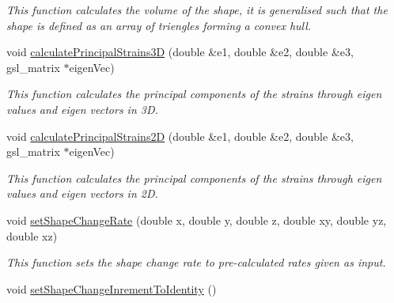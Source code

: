\begin{DoxyCompactItemize}
\begin{DoxyCompactList}\small\item\em This function calculates the volume of the shape, it is generalised such that the shape is defined as an array of triengles forming a convex hull. \end{DoxyCompactList}\item 
\hypertarget{classShapeBase_a3cde54fe712bac297fa73949d07c1bd4}{}void \hyperlink{classShapeBase_a3cde54fe712bac297fa73949d07c1bd4}{calculate\+Principal\+Strains3\+D} (double \&e1, double \&e2, double \&e3, gsl\+\_\+matrix $\ast$eigen\+Vec)\label{classShapeBase_a3cde54fe712bac297fa73949d07c1bd4}

\begin{DoxyCompactList}\small\item\em This function calculates the principal components of the strains through eigen values and eigen vectors in 3\+D. \end{DoxyCompactList}\item 
\hypertarget{classShapeBase_a6fe833f9684db5cc1847761b6bbd9aa9}{}void \hyperlink{classShapeBase_a6fe833f9684db5cc1847761b6bbd9aa9}{calculate\+Principal\+Strains2\+D} (double \&e1, double \&e2, double \&e3, gsl\+\_\+matrix $\ast$eigen\+Vec)\label{classShapeBase_a6fe833f9684db5cc1847761b6bbd9aa9}

\begin{DoxyCompactList}\small\item\em This function calculates the principal components of the strains through eigen values and eigen vectors in 2\+D. \end{DoxyCompactList}\item 
\hypertarget{classShapeBase_a8a9f91384133d8953dbb38d71cc29d51}{}void \hyperlink{classShapeBase_a8a9f91384133d8953dbb38d71cc29d51}{set\+Shape\+Change\+Rate} (double x, double y, double z, double xy, double yz, double xz)\label{classShapeBase_a8a9f91384133d8953dbb38d71cc29d51}

\begin{DoxyCompactList}\small\item\em This function sets the shape change rate to pre-\/calculated rates given as input. \end{DoxyCompactList}\item 
\hypertarget{classShapeBase_adacee19f788f056fe794bde14b934063}{}void \hyperlink{classShapeBase_adacee19f788f056fe794bde14b934063}{set\+Shape\+Change\+Inrement\+To\+Identity} ()\label{classShapeBase_adacee19f788f056fe794bde14b934063}


\end{DoxyCompactItemize}
